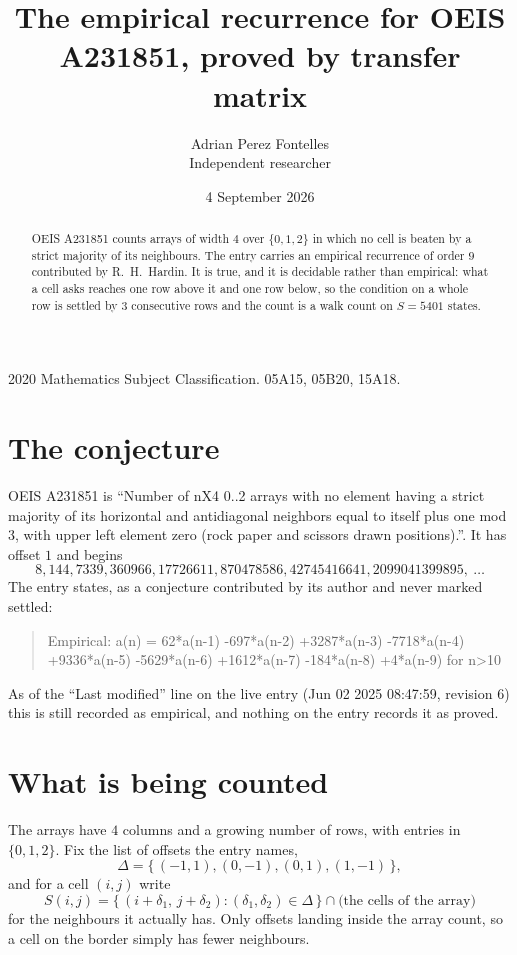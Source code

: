 \documentclass[11pt,a4paper]{article}
\title{The empirical recurrence for OEIS A231851, proved by transfer matrix}
\author{Adrian Perez Fontelles\\ \small Independent researcher}
\date{4 September 2026}
\theoremstyle{plain}
\theoremstyle{definition}
\begin{document}
\maketitle

\begin{abstract}
OEIS A231851 counts arrays of width $4$ over $\{0,1,2\}$ in which no cell is beaten by a strict majority of its neighbours. The entry carries an
empirical recurrence of order $9$ contributed by R.~H.~Hardin. It is true, and it is
decidable rather than empirical: what a cell asks reaches one row above
it and one row below, so the condition on a whole row is settled by
$3$ consecutive rows and the count is a walk count on $S=5401$ states.
\end{abstract}

\noindent\small 2020 Mathematics Subject Classification. 05A15, 05B20, 15A18.\normalsize

\section{The conjecture}

OEIS A231851 is ``Number of nX4 0..2 arrays with no element having a strict majority of its horizontal and antidiagonal neighbors equal to itself plus one mod 3, with upper left element zero (rock paper and scissors drawn positions).''. It has offset $1$ and begins
\[
8, 144, 7339, 360966, 17726611, 870478586, 42745416641, 2099041399895,\ \dots
\]
The entry states, as a conjecture contributed by its author and never marked settled:
\begin{quote}
Empirical: a(n) = 62*a(n-1) -697*a(n-2) +3287*a(n-3) -7718*a(n-4) +9336*a(n-5) -5629*a(n-6) +1612*a(n-7) -184*a(n-8) +4*a(n-9) for n>10
\end{quote}
As of the ``Last modified'' line on the live entry (Jun 02 2025 08:47:59, revision 6) this is still
recorded as empirical, and nothing on the entry records it as proved.

\section{What is being counted}

The arrays have $4$ columns and a growing number of rows, with entries in $\{0,1,2\}$. Fix the
list of offsets the entry names,
\[
\Delta=\{\,(-1,1), (0,-1), (0,1), (1,-1)\,\},
\]
and for a cell $(i,j)$ write
\[
S(i,j)=\{\,(i+\delta_1,\,j+\delta_2) : (\delta_1,\delta_2)\in\Delta\,\}\cap
\text{(the cells of the array)}
\]
for the neighbours it actually has. Only offsets landing inside the array count, so a cell on
the border simply has fewer neighbours.
\end{document}
